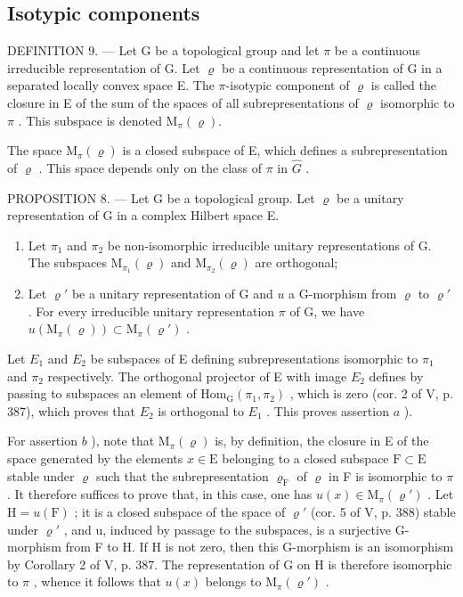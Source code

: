 \subsection{Isotypic components}

DEFINITION 9. --- Let G be a topological group and let \(\pi\) be a continuous irreducible representation of G. Let \(\varrho\) be a continuous representation of G in a separated locally convex space E. The \(\pi\)-isotypic component of \(\varrho\) is called the closure in E of the sum of the spaces of all subrepresentations of \(\varrho\) isomorphic to \(\pi\) . This subspace is denoted \(\mathrm{M}_{\pi}(\varrho)\).

The space \(\mathrm{M}_{\pi}(\varrho)\) is a closed subspace of E, which defines a subrepresentation of \(\varrho\) . This space depends only on the class of \(\pi\) in \(\widehat{G}\) .

PROPOSITION 8. — Let G be a topological group. Let \(\varrho\) be a unitary representation of G in a complex Hilbert space E.

\begin{enumerate}
\def\labelenumi{\alph{enumi})}
\item
  Let \(\pi_1\) and \(\pi_2\) be non-isomorphic irreducible unitary representations of G. The subspaces \(\mathrm{M}_{\pi_1}(\varrho)\) and \(\mathrm{M}_{\pi_2}(\varrho)\) are orthogonal;
\item
  Let \(\varrho'\) be a unitary representation of G and \(u\) a G-morphism from \(\varrho\) to \(\varrho'\) . For every irreducible unitary representation \(\pi\) of G, we have \(u(\mathrm{M}_{\pi}(\varrho)) \subset \mathrm{M}_{\pi}(\varrho')\) .
\end{enumerate}

Let \(E_{1}\) and \(E_{2}\) be subspaces of E defining subrepresentations isomorphic to \(\pi_{1}\) and \(\pi_{2}\) respectively. The orthogonal projector of E with image \(E_{2}\) defines by passing to subspaces an element of \(\mathrm{Hom}_{\mathrm{G}}(\pi_{1},\pi_{2})\) , which is zero (cor. 2 of V, p. 387), which proves that \(E_{2}\) is orthogonal to \(E_{1}\) . This proves assertion \(a\) ).

For assertion \(b\) ), note that \(\mathrm{M}_{\pi}(\varrho)\) is, by definition, the closure in E of the space generated by the elements \(x \in \mathrm{E}\) belonging to a closed subspace \(\mathrm{F} \subset \mathrm{E}\) stable under \(\varrho\) such that the subrepresentation \(\varrho_{\mathrm{F}}\) of \(\varrho\) in F is isomorphic to \(\pi\) . It therefore suffices to prove that, in this case, one has \(u(x) \in \mathrm{M}_{\pi}(\varrho')\) . Let \(\mathrm{H} = u(\mathrm{F})\) ; it is a closed subspace of the space of \(\varrho'\) (cor. 5 of V, p. 388) stable under \(\varrho'\) , and u, induced by passage to the subspaces, is a surjective G-morphism from F to H. If H is not zero, then this G-morphism is an isomorphism by Corollary 2 of V, p. 387. The representation of G on H is therefore isomorphic to \(\pi\) , whence it follows that \(u(x)\) belongs to \(\mathrm{M}_{\pi}(\varrho')\) .

